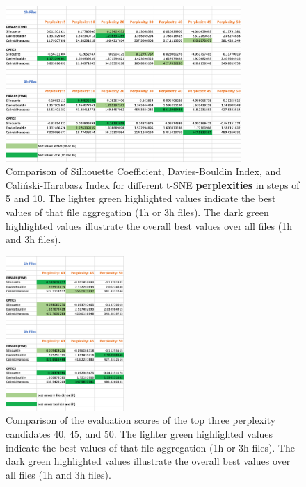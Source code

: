 \begin{figure}
  \centering
  \includegraphics[width=0.8\textwidth]{./images/tsneParametersTest/perplexity/perplexityEvaluationScores.png}
  \caption{Comparison of Silhouette Coefficient, Davies-Bouldin Index, and Caliński-Harabasz Index for different t-SNE \textbf{perplexities} in steps of 5 and 10. The lighter green highlighted values indicate the best values of that file aggregation (1h or 3h files). The dark green highlighted values illustrate the overall best values over all files (1h and 3h files).}
  \label{figure:perplexityEvaluationScores}
\end{figure}

\begin{figure}
  \centering
  \includegraphics[width=0.4\textwidth]{./images/tsneParametersTest/perplexity/perplexityEvaluationScoresDetailed.png}
  \caption{Comparison of the evaluation scores of the top three perplexity candidates 40, 45, and 50. The lighter green highlighted values indicate the best values of that file aggregation (1h or 3h files). The dark green highlighted values illustrate the overall best values over all files (1h and 3h files).}
  \label{figure:perplexityEvaluationScoresDetailed}
\end{figure}


